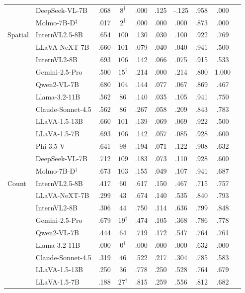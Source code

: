 \begin{tabular}{@{}llcccccccc@{}}
 & DeepSeek-VL-7B & .068 & $8^\dagger$ & .000 & .125 & -.125 & .958 & .000 \\
 & Molmo-7B-D$^\ddagger$ & .017 & $2^\dagger$ & .000 & .000 & .000 & .873 & .000 \\
\midrule
Spatial & InternVL2.5-8B & .654 & $100$ & .130 & .030 & .100 & .922 & .769 \\
 & LLaVA-NeXT-7B & .660 & $101$ & .079 & .040 & .040 & .941 & .500 \\
 & InternVL2-8B & .693 & $106$ & .142 & .066 & .075 & .915 & .533 \\
 & Gemini-2.5-Pro & .500 & $15^\dagger$ & .214 & .000 & .214 & .800 & 1.000 \\
 & Qwen2-VL-7B & .680 & $104$ & .144 & .077 & .067 & .869 & .467 \\
 & Llama-3.2-11B & .562 & $86$ & .140 & .035 & .105 & .941 & .750 \\
 & Claude-Sonnet-4.5 & .562 & $86$ & .267 & .058 & .209 & .843 & .783 \\
 & LLaVA-1.5-13B & .660 & $101$ & .139 & .069 & .069 & .922 & .500 \\
 & LLaVA-1.5-7B & .693 & $106$ & .142 & .057 & .085 & .928 & .600 \\
 & Phi-3.5-V & .641 & $98$ & .194 & .071 & .122 & .908 & .632 \\
 & DeepSeek-VL-7B & .712 & $109$ & .183 & .073 & .110 & .928 & .600 \\
 & Molmo-7B-D$^\ddagger$ & .673 & $103$ & .155 & .049 & .107 & .941 & .687 \\
\midrule
Count & InternVL2.5-8B & .417 & $60$ & .617 & .150 & .467 & .715 & .757 \\
 & LLaVA-NeXT-7B & .299 & $43$ & .674 & .140 & .535 & .840 & .793 \\
 & InternVL2-8B & .306 & $44$ & .750 & .114 & .636 & .799 & .848 \\
 & Gemini-2.5-Pro & .679 & $19^\dagger$ & .474 & .105 & .368 & .786 & .778 \\
 & Qwen2-VL-7B & .444 & $64$ & .719 & .172 & .547 & .764 & .761 \\
 & Llama-3.2-11B & .000 & $0^\dagger$ & .000 & .000 & .000 & .632 & .000 \\
 & Claude-Sonnet-4.5 & .319 & $46$ & .522 & .217 & .304 & .785 & .583 \\
 & LLaVA-1.5-13B & .250 & $36$ & .778 & .250 & .528 & .764 & .679 \\
 & LLaVA-1.5-7B & .188 & $27^\dagger$ & .815 & .259 & .556 & .812 & .682 \\

\end{tabular}
